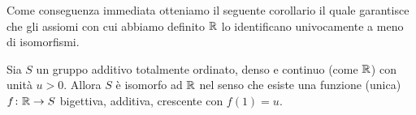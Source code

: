  
Come conseguenza immediata otteniamo il seguente corollario il quale
garantisce che gli assiomi con cui abbiamo definito $\RR$
lo identificano univocamente a meno di isomorfismi.

\begin{corollary}[unicità di $\RR$]%
  \label{th:unicitaR}%
  Sia $S$ un gruppo additivo totalmente ordinato, denso e continuo (come $\RR$)
  con unità $u>0$.  
  Allora $S$ è isomorfo ad $\RR$ nel senso che esiste una funzione (unica)
  $f\colon {\mathbb R}\to S$ bigettiva, additiva, crescente con $f(1)=u$.
\end{corollary}

